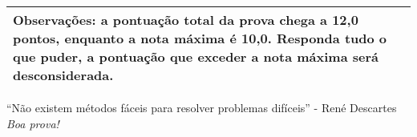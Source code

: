 \documentclass[a4paper,10pt]{article}
\begin{document}
\begin{multicols*}{2}
{     \noindent
     \begin{tabular}{|p{7.8cm}|}
        \hline
        \cellcolor[gray]{0.8}
        Observações: a pontuação total da prova chega a 12,0 pontos, enquanto a nota máxima é 10,0. Responda tudo o que puder, a pontuação que exceder a nota máxima será desconsiderada.
        \\
        \hline
    \end{tabular}
    }
    \vspace{0.2cm}
    \begin{center}
        “Não existem métodos fáceis para resolver problemas difíceis” - René Descartes\\
        \vspace{0.2cm}
        \textit{Boa prova!}
    \end{center}
\end{multicols*}
 
\end{document}

